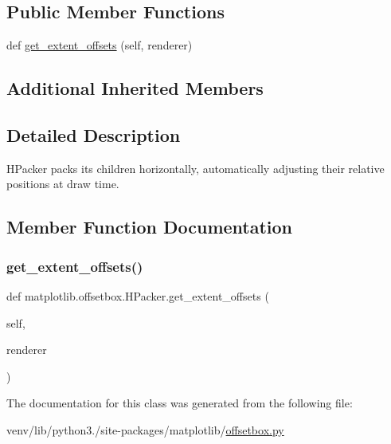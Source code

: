 \subsection*{Public Member Functions}
\begin{DoxyCompactItemize}
\item 
def \hyperlink{classmatplotlib_1_1offsetbox_1_1HPacker_aa9b7a73684276f593e0acd9bc80e09e5}{get\+\_\+extent\+\_\+offsets} (self, renderer)
\end{DoxyCompactItemize}
\subsection*{Additional Inherited Members}


\subsection{Detailed Description}
\begin{DoxyVerb}HPacker packs its children horizontally, automatically adjusting their
relative positions at draw time.
\end{DoxyVerb}
 

\subsection{Member Function Documentation}
\mbox{\label{classmatplotlib_1_1offsetbox_1_1HPacker_aa9b7a73684276f593e0acd9bc80e09e5}} 
\subsubsection{\texorpdfstring{get\+\_\+extent\+\_\+offsets()}{get\_extent\_offsets()}}
{\footnotesize\ttfamily def matplotlib.\+offsetbox.\+H\+Packer.\+get\+\_\+extent\+\_\+offsets (\begin{DoxyParamCaption}\item[{}]{self,  }\item[{}]{renderer }\end{DoxyParamCaption})}



The documentation for this class was generated from the following file\+:\begin{DoxyCompactItemize}
\item 
venv/lib/python3./site-\/packages/matplotlib/\hyperlink{offsetbox_8py}{offsetbox.\+py}\end{DoxyCompactItemize}
